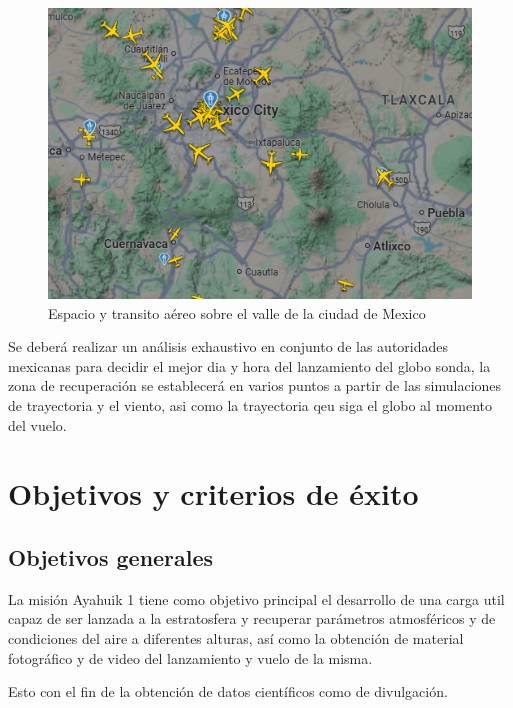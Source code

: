 \documentclass[letterpaper,12pt]{article} %
\begin{document}
    \begin{figure}[H]
      \centerline{\includegraphics[width=.8\textwidth]{Espacioaereo.png}}
      \caption{Espacio y transito aéreo sobre el valle de la ciudad de Mexico}
      \label{fig:Espacio}
    \end{figure}

    Se deberá realizar un análisis exhaustivo en conjunto de las autoridades mexicanas 
    para decidir el mejor dia y hora del lanzamiento del globo sonda, la zona de recuperación se 
    establecerá en varios puntos a partir de las simulaciones de trayectoria y el viento, asi como 
    la trayectoria qeu siga el globo al momento del vuelo.


\newpage
\section{Objetivos y criterios de éxito}

    \subsection{Objetivos generales}
    La misión Ayahuik 1 tiene como objetivo principal el desarrollo de una carga util capaz de ser lanzada a la estratosfera
    y recuperar parámetros atmosféricos y de condiciones del aire a diferentes alturas,
    así como la obtención de material fotográfico y de video del lanzamiento y vuelo de la misma.


    Esto con el fin de la obtención de datos científicos como de divulgación.
\end{document}
